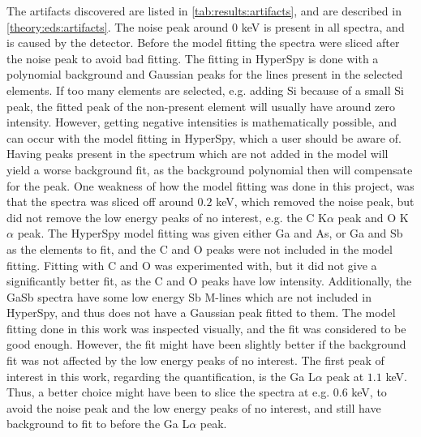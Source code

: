 The artifacts discovered are listed in \cref{tab:results:artifacts}, and are described in \cref{theory:eds:artifacts}.
The noise peak around $0$ keV is present in all spectra, and is caused by the detector.
Before the model fitting the spectra were sliced after the noise peak to avoid bad fitting.
The fitting in HyperSpy is done with a polynomial background and Gaussian peaks for the lines present in the selected elements.
If too many elements are selected, e.g. adding Si because of a small Si peak, the fitted peak of the non-present element will usually have around zero intensity.
However, getting negative intensities is mathematically possible, and can occur with the model fitting in HyperSpy, which a user should be aware of.
Having peaks present in the spectrum which are not added in the model will yield a worse background fit, as the background polynomial then will compensate for the peak.
One weakness of how the model fitting was done in this project, was that the spectra was sliced off around $0.2$ keV, which removed the noise peak, but did not remove the low energy peaks of no interest, e.g. the C K$\alpha$ peak and O K$\alpha$ peak.
The HyperSpy model fitting was given either Ga and As, or Ga and Sb as the elements to fit, and the C and O peaks were not included in the model fitting.
Fitting with C and O was experimented with, but it did not give a significantly better fit, as the C and O peaks have low intensity.
Additionally, the GaSb spectra have some low energy Sb M-lines which are not included in HyperSpy, and thus does not have a Gaussian peak fitted to them.
The model fitting done in this work was inspected visually, and the fit was considered to be good enough.
However, the fit might have been slightly better if the background fit was not affected by the low energy peaks of no interest.
The first peak of interest in this work, regarding the quantification, is the Ga L$\alpha$ peak at $1.1$ keV.
Thus, a better choice might have been to slice the spectra at e.g. $0.6$ keV, to avoid the noise peak and the low energy peaks of no interest, and still have background to fit to before the Ga L$\alpha$ peak.

